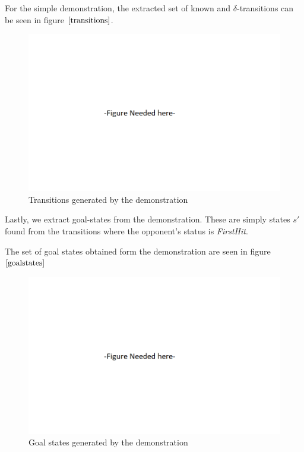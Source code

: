 For the simple demonstration, the extracted set of known and $\delta$-transitions can be seen in figure $\ref{transitions}$.

\begin{figure}[h]
	\centering
	\includegraphics[width=\textwidth]{Figures/Placeholder.png}
	\caption{Transitions generated by the demonstration}
	\label{transitions}
\end{figure}

Lastly, we extract goal-states from the demonstration. These are simply states $s'$ found from the transitions where the opponent's status is \textit{FirstHit}. 

The set of goal states obtained form the demonstration are seen in figure $\ref{goalstates}$

\begin{figure}[h]
	\centering
	\includegraphics[scale = 0.5]{Figures/Placeholder.png}
	\caption{Goal states generated by the demonstration}
	\label{goalstates}
\end{figure}


